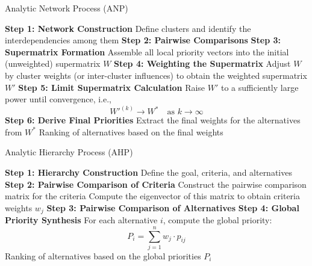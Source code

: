 \begin{algorithm}[H]
    \caption{Analytic Network Process (ANP)}
    \textbf{Step 1: Network Construction}\;
    \quad Define clusters and identify the interdependencies among them\;
    \textbf{Step 2: Pairwise Comparisons}\;
    \quad {}
    \textbf{Step 3: Supermatrix Formation}\;
    \quad Assemble all local priority vectors into the initial (unweighted) supermatrix $W$\;
    \textbf{Step 4: Weighting the Supermatrix}\;
    \quad Adjust $W$ by cluster weights (or inter-cluster influences) to obtain the weighted supermatrix $W'$\;
    \textbf{Step 5: Limit Supermatrix Calculation}\;
    \quad Raise $W'$ to a sufficiently large power until convergence, i.e., 
    \[
    W'^{(k)} \rightarrow W^* \quad \text{as } k \to \infty
    \]
    \textbf{Step 6: Derive Final Priorities}\;
    \quad Extract the final weights for the alternatives from $W^*$\;
    \Return Ranking of alternatives based on the final weights\;
    \end{algorithm}


\begin{algorithm}[H]
    \caption{Analytic Hierarchy Process (AHP)}
    \textbf{Step 1: Hierarchy Construction}\;
    \quad Define the goal, criteria, and alternatives\;
    \textbf{Step 2: Pairwise Comparison of Criteria}\;
    \quad Construct the pairwise comparison matrix for the criteria\;
    \quad Compute the eigenvector of this matrix to obtain criteria weights \(w_j\)\;
    \quad {}
    \textbf{Step 3: Pairwise Comparison of Alternatives}\;
    \quad {}
    \textbf{Step 4: Global Priority Synthesis}\;
    \quad For each alternative \(i\), compute the global priority:
    \[
    P_i = \sum_{j=1}^{n} w_j \cdot p_{ij}
    \]
    \Return Ranking of alternatives based on the global priorities \(P_i\)\;
    \end{algorithm}



